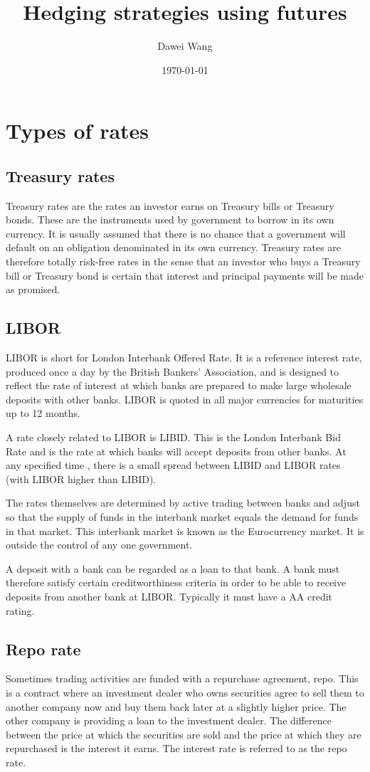 \documentclass{article}
\title{Hedging strategies using futures}
\author{Dawei Wang}
\date{\today}
\begin{document}
	\maketitle
\section{Types of rates}
\subsection{Treasury rates}
Treasury rates are the rates an investor earns on Treasury bills or Treasury bonds. These are the instruments used by government to borrow in its own currency. It is usually assumed that there is no chance that a government will default on an obligation denominated in its own currency. Treasury rates are therefore totally risk-free rates in the sense that an investor who buys a Treasury bill or Treasury bond is certain that interest and principal payments will be made as promised.

\subsection{LIBOR}
LIBOR is short for London Interbank Offered Rate. It is a reference interest rate, produced once a day by the British Bankers' Association, and is designed to reflect the rate of interest at which banks are prepared to make large wholesale deposits with other banks. LIBOR is quoted in all major currencies for maturities up to 12 months.

A rate closely related to LIBOR is LIBID. This is the London Interbank Bid Rate and is the rate at which banks will accept deposits from other banks. At any specified time , there is a small spread between LIBID and LIBOR rates (with LIBOR higher than LIBID). 

The rates themselves are determined by active trading between banks and adjust so that the supply of funds in the interbank market equals the demand for funds in that market. This interbank market is known as the Eurocurrency market. It is outside the control of any one government.

A deposit with a bank can be regarded as a loan to that bank. A bank must therefore satisfy certain creditworthiness criteria in order to be able to receive deposits from another bank at LIBOR. Typically it must have a AA credit rating.

\subsection{Repo rate}
Sometimes trading activities are funded with a repurchase agreement, repo. This is a contract where an investment dealer who owns securities agree to sell them to another company now and buy them back later at a slightly higher price. The other company is providing a loan to the investment dealer. The difference between the price at which the securities are sold and the price at which they are repurchased is the interest it earns. The interest rate is referred to as the repo rate.
\end{document}
